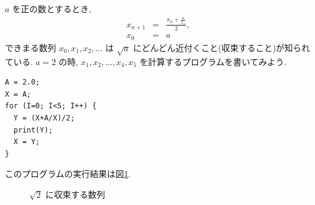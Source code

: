 \documentclass{jbook}
\begin{document}
\begin{example} \rm
$a$ を正の数とするとき,
\begin{eqnarray*}
  x_{n+1} &=& \frac{x_n + \frac{a}{x_n}}{2}, \\
  x_0 &=& a
\end{eqnarray*}
できまる数列 $x_0, x_1, x_2, \ldots $ 
は $\sqrt{a}$ にどんどん近付くこと(収束すること)が知られている.
$a=2$ の時, $x_1, x_2, \ldots, x_4, x_5$ を計算するプログラムを書いてみよう.
\begin{screen}
\begin{verbatim}
A = 2.0;
X = A;
for (I=0; I<5; I++) {
  Y = (X+A/X)/2; 
  print(Y);
  X = Y;
}
\end{verbatim}
\end{screen}
\end{example}

このプログラムの実行結果は図\ref{fig:sqrt}.
\begin{figure}[tbh]
\caption{$\sqrt{2}$ に収束する数列} \label{fig:sqrt}
\end{figure}
\end{document}
